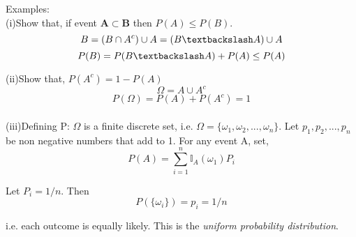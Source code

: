 \documentclass[12pt]{article}
\begin{document}
Examples: \\

(i)Show that, if event $\mathbf{A \subset B}$ then $P(A) \le P(B)$. \\



$$B = (B \cap A^c) \cup A = (B \textbackslash A) \cup A$$
$$P(B) = P(B \textbackslash A) + P(A) \le P(A)$$

(ii)Show that, $P(A^c) = 1 - P(A)$
$$ \Omega = A \cup A^c $$
$$P(\Omega) =P(A) + P(A^c) = 1$$\\

(iii)Defining P: $ \Omega $ is a finite discrete set, i.e. $ \Omega=\{\omega_1,\omega_2,...,\omega_n\} $. Let $p_1,p_2,...,p_n$ be non negative numbers that add to 1. For any event A, set,
$$ P(A) = \sum_{i=1}^n\mathbb{I}_A(\omega_1)P_i $$ 

Let $P_i = 1/n$. Then 
$$P(\{\omega_i\}) = p_i = 1/n$$

i.e. each outcome is equally likely. This is the \textit{uniform probability distribution}.\\
\end{document}

